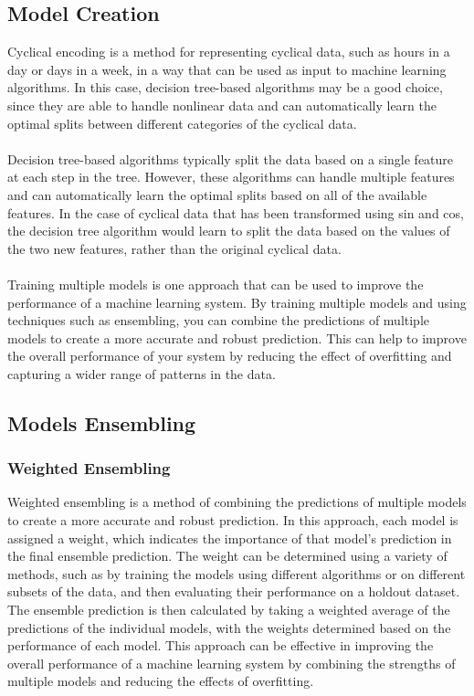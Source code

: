 \documentclass{report}
\begin{document}
\subsection{Model Creation}
Cyclical encoding is a method for representing cyclical data, such as hours in a day or days in a week, in a way that can be used as input to machine learning algorithms. In this case, decision tree-based algorithms may be a good choice, since they are able to handle nonlinear data and can automatically learn the optimal splits between different categories of the cyclical data.\\
\\
Decision tree-based algorithms typically split the data based on a single feature at each step in the tree. However, these algorithms can handle multiple features and can automatically learn the optimal splits based on all of the available features. In the case of cyclical data that has been transformed using sin and cos, the decision tree algorithm would learn to split the data based on the values of the two new features, rather than the original cyclical data.\\
\\
Training multiple models is one approach that can be used to improve the performance of a machine learning system. By training multiple models and using techniques such as ensembling, you can combine the predictions of multiple models to create a more accurate and robust prediction. This can help to improve the overall performance of your system by reducing the effect of overfitting and capturing a wider range of patterns in the data.\\
\subsection{Models Ensembling}
\subsubsection{Weighted Ensembling}
Weighted ensembling is a method of combining the predictions of multiple models to create a more accurate and robust prediction. In this approach, each model is assigned a weight, which indicates the importance of that model's prediction in the final ensemble prediction. The weight can be determined using a variety of methods, such as by training the models using different algorithms or on different subsets of the data, and then evaluating their performance on a holdout dataset. The ensemble prediction is then calculated by taking a weighted average of the predictions of the individual models, with the weights determined based on the performance of each model. This approach can be effective in improving the overall performance of a machine learning system by combining the strengths of multiple models and reducing the effects of overfitting.
\end{document}
